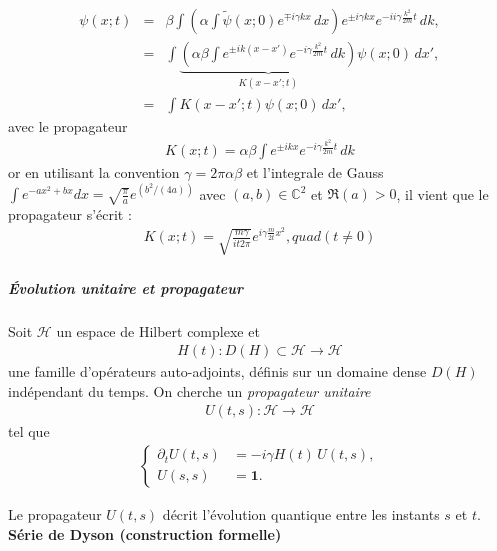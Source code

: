 \begin{eqnarray}
    \psi (x ; t )  & =  &\beta \int \left ( \alpha \int \tilde \psi (x ; 0 ) e^{\mp i \gamma kx } \, dx  \right ) e^{\pm i \gamma kx } e^{-i i\gamma\frac{k^2}{2m} t} \, dk ,\\
    & = & \int \underbrace{\left ( \alpha \beta \int e^{\pm i k ( x - x')} e^{-i \gamma\frac{k^2}{2m} t} \, dk  \right )}_{K(x-x';t)}  \psi (x ; 0 ) \, dx',\\
    & = & \int K(x-x';t)  \psi (x ; 0 ) \, dx',
\end{eqnarray}
avec le propagateur 
\begin{eqnarray}
    K(x;t) =  \alpha \beta \int e^{\pm i k x} e^{-i \gamma\frac{k^2}{2m} t} \, dk
\end{eqnarray}
or en utilisant la convention $\gamma = 2\pi \alpha \beta $ et l'integrale de Gauss $\int e^{-a x^2 + b x } dx = \sqrt{\frac{\pi}{a}}e^{(b^2/(4a))}$ avec $(a,b)\in \mathbb C^2$ et $\Re(a)>0$, il vient que le propagateur s'écrit :
\begin{eqnarray}
    K(x;t) = \sqrt{\frac{m\gamma}{i t 2 \pi }} e^{i \gamma \frac{m}{2t} x^2 },quad ( t \neq 0 )
\end{eqnarray}

\subparagraph{Évolution unitaire et propagateur}

Soit $\mathcal H$ un espace de Hilbert complexe et
\begin{eqnarray}
    H(t) : D(H)\subset\mathcal H \longrightarrow \mathcal H
\end{eqnarray}
une famille d’opérateurs auto-adjoints, définis sur un domaine dense $D(H)$
indépendant du temps. On cherche un \emph{propagateur unitaire}
\begin{eqnarray}
    U(t,s):\mathcal H\to\mathcal H
\end{eqnarray}
tel que
\begin{eqnarray}
    \label{eq:fundamental-problem}
    \left\{
    \begin{aligned}
    \partial_t U(t,s) &= -i\gamma H(t)\,U(t,s), \\
    U(s,s) &= \mathbf 1 .
    \end{aligned}
    \right . 
\end{eqnarray}

Le propagateur $U(t,s)$ décrit l’évolution quantique entre les instants $s$ et $t$.\\



{\bf Série de Dyson (construction formelle)}

